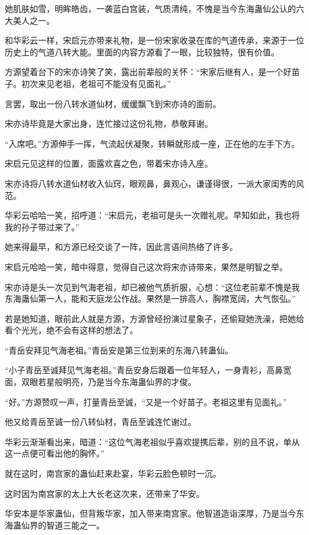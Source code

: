 \begin{this_body}
她肌肤如雪，明眸皓齿，一袭蓝白宫装，气质清纯，不愧是当今东海蛊仙公认的六大美人之一。

和华彩云一样，宋启元亦带来礼物，是一份宋家收录在库的气道传承，来源于一位历史上的气道八转大能。里面的内容方源看了一眼，比较独特，很有价值。

方源望着台下的宋亦诗笑了笑，露出前辈般的关怀：“宋家后继有人，是一个好苗子。初次来见老祖，老祖可不能没有见面礼。”

言罢，取出一份八转水道仙材，缓缓飘飞到宋亦诗的面前。

宋亦诗毕竟是大家出身，连忙接过这份礼物，恭敬拜谢。

“入席吧。”方源伸手一挥，气流起伏凝聚，转瞬就形成一座，正在他的左手下方。

宋启元见这样的位置，面露欢喜之色，带着宋亦诗入座。

宋亦诗将八转水道仙材收入仙窍，眼观鼻，鼻观心，谦谨得很，一派大家闺秀的风范。

华彩云哈哈一笑，招呼道：“宋启元，老祖可是头一次赠礼呢。早知如此，我也将我的孙子带过来了。”

她来得最早，和方源已经交谈了一阵，因此言语间热络了许多。

宋启元哈哈一笑，暗中得意，觉得自己这次将宋亦诗带来，果然是明智之举。

宋亦诗是头一次见到气海老祖，却已被他气质折服，心想：“这位老前辈不愧是我东海蛊仙第一人，能和天庭龙公作战。果然是一排高人，胸襟宽阔，大气恢弘。”

若是她知道，眼前此人就是方源，方源曾经扮演过星象子，还偷窥她洗澡，把她给看个光光，绝不会有这样的想法了。

“青岳安拜见气海老祖。”青岳安是第三位到来的东海八转蛊仙。

“小子青岳至诚拜见气海老祖。”青岳安身后跟着一位年轻人，一身青衫，高鼻宽面，双眼若星般明亮，乃是当今东海蛊仙界的才俊。

“好。”方源赞叹一声，打量青岳至诚，“又是一个好苗子。老祖这里有见面礼。”

他又给青岳至诚一份八转仙材，青岳至诚连忙谢过。

华彩云渐渐看出来，暗道：“这位气海老祖似乎喜欢提携后辈，别的且不说，单从这一点便可看出他的胸怀。”

就在这时，南宫家的蛊仙赶来赴宴，华彩云脸色顿时一沉。

这时因为南宫家的太上大长老这次来，还带来了华安。

华安本是华家蛊仙，但背叛华家，加入带来南宫家。他智道造诣深厚，乃是当今东海蛊仙界的智道三能之一。


\end{this_body}
